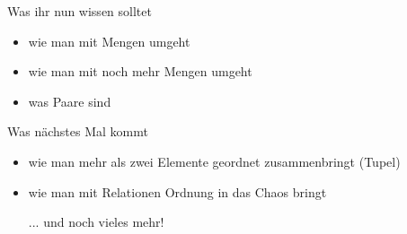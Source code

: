 

\begin{frame}
	\begin{block}{Was ihr nun wissen solltet}
		\begin{itemize}
			\item wie man mit Mengen umgeht
			\item wie man mit noch mehr Mengen umgeht
			\item was Paare sind
		\end{itemize}
	\end{block}

	\begin{block}{Was nächstes Mal kommt}
		\begin{itemize}
			\item wie man mehr als zwei Elemente geordnet zusammenbringt (Tupel)
			\item wie man mit Relationen Ordnung in das Chaos bringt
			\item[...] und noch vieles mehr!
		\end{itemize}
	\end{block}
\end{frame}





